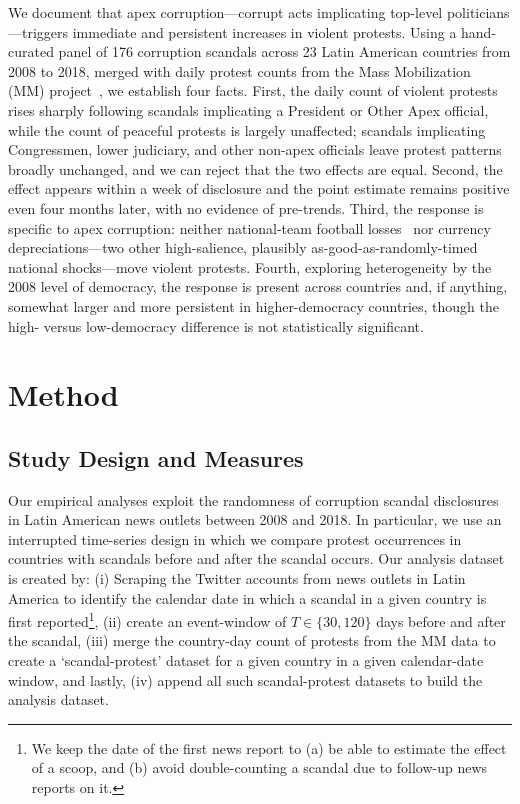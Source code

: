 \documentclass[11pt]{article}
\begin{document}
We document that apex corruption---corrupt acts implicating top-level politicians---triggers immediate and persistent increases in violent protests. Using a hand-curated panel of 176 corruption scandals across 23 Latin American countries from 2008 to 2018, merged with daily protest counts from the Mass Mobilization (MM) project~\citep{clark2016mass}, we establish four facts. First, the daily count of violent protests rises sharply following scandals implicating a President or Other Apex official, while the count of peaceful protests is largely unaffected; scandals implicating Congressmen, lower judiciary, and other non-apex officials leave protest patterns broadly unchanged, and we can reject that the two effects are equal. Second, the effect appears within a week of disclosure and the point estimate remains positive even four months later, with no evidence of pre-trends. Third, the response is specific to apex corruption: neither national-team football losses~\citep[see e.g.,][]{DuranteFutbol} nor currency depreciations---two other high-salience, plausibly as-good-as-randomly-timed national shocks---move violent protests. Fourth, exploring heterogeneity by the 2008 level of democracy, the response is present across countries and, if anything, somewhat larger and more persistent in higher-democracy countries, though the high- versus low-democracy difference is not statistically significant.

\section{Method}\label{sec:methods}
\subsection{Study Design and Measures}

Our empirical analyses exploit the randomness of corruption scandal disclosures in Latin American news outlets between 2008 and 2018. In particular, we use an interrupted time-series design in which we compare protest occurrences in countries with scandals before and after the scandal occurs. Our analysis dataset is created by: (i) Scraping the Twitter accounts from news outlets in Latin America to identify the calendar date in which a scandal in a given country is first reported\footnote{We keep the date of the first news report to (a) be able to estimate the effect of a scoop, and (b) avoid double-counting a scandal due to follow-up news reports on it.}, (ii) create an event-window of $T \in \{30, 120\}$ days before and after the scandal, (iii) merge the country-day count of protests from the MM data to create a `scandal-protest' dataset for a given country in a given calendar-date window, and lastly, (iv) append all such scandal-protest datasets to build the analysis dataset.
\end{document}
